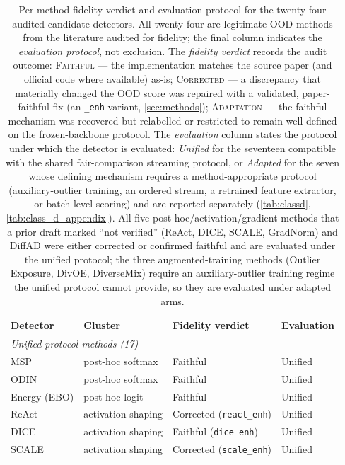 \begin{table}[h]
\centering
\caption{Per-method fidelity verdict and evaluation protocol for the twenty-four
audited candidate detectors. All twenty-four are legitimate OOD methods from the
literature audited for fidelity; the final column indicates the \emph{evaluation
protocol}, not exclusion. The \emph{fidelity verdict} records the audit outcome:
\textsc{Faithful} --- the implementation matches the source paper (and official
code where available) as-is; \textsc{Corrected} --- a discrepancy that materially
changed the OOD score was repaired with a validated, paper-faithful fix (an
\texttt{\_enh} variant, \cref{sec:methods}); \textsc{Adaptation} --- the faithful
mechanism was recovered but relabelled or restricted to remain well-defined on the
frozen-backbone protocol. The \emph{evaluation} column states the protocol under which
the detector is evaluated: \emph{Unified} for the seventeen compatible with the shared
fair-comparison streaming protocol, or \emph{Adapted} for the seven whose defining
mechanism requires a method-appropriate protocol (auxiliary-outlier training, an
ordered stream, a retrained feature extractor, or batch-level scoring) and are
reported separately (\cref{tab:classd}, \cref{tab:class_d_appendix}). All five
post-hoc/activation/gradient methods that a prior draft marked ``not verified'' (ReAct,
DICE, SCALE, GradNorm) and DiffAD were either corrected or confirmed faithful and are
evaluated under the unified protocol; the three augmented-training methods (Outlier
Exposure, DivOE, DiverseMix) require an auxiliary-outlier training regime the unified
protocol cannot provide, so they are evaluated under adapted arms.}
\label{tab:audit}
\small
\begin{tabular}{lll l}
\toprule
Detector & Cluster & Fidelity verdict & Evaluation \\
\midrule
\multicolumn{4}{l}{\emph{Unified-protocol methods (17)}} \\
\midrule
MSP & post-hoc softmax & Faithful & Unified \\
ODIN & post-hoc softmax & Faithful & Unified \\
Energy (EBO) & post-hoc logit & Faithful & Unified \\
ReAct & activation shaping & Corrected (\texttt{react\_enh}) & Unified \\
DICE & activation shaping & Faithful (\texttt{dice\_enh}) & Unified \\
SCALE & activation shaping & Corrected (\texttt{scale\_enh}) & Unified \\

\end{tabular}
\end{table}

